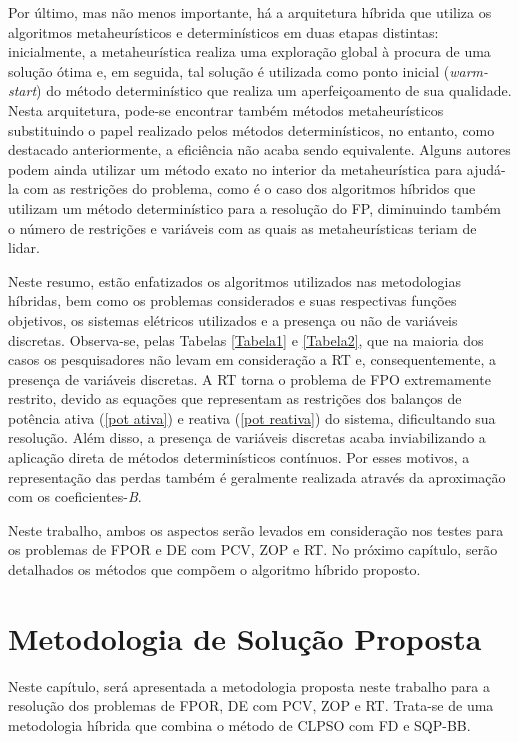 \documentclass[
	12pt,				%
	openany,			%
	twoside,			%
	a4paper,			%
	chapter=TITLE,		%
	section=Title,		%
	subsection=Title,	%
	subsubsection=Title,%
	english,			%
	french,				%
	spanish,			%
	brazil			%
	]{abntex2}
\begin{document}
\begin{ERRATA}
Por último, mas não menos importante, há a arquitetura híbrida que utiliza os algoritmos metaheurísticos e determinísticos em duas etapas distintas: inicialmente, a metaheurística realiza uma exploração global à procura de uma solução ótima e, em seguida, tal solução é utilizada como ponto inicial (\emph{warm-start}) do método determinístico que realiza um aperfeiçoamento de sua qualidade. Nesta arquitetura, pode-se encontrar também métodos metaheurísticos substituindo o papel realizado pelos métodos determinísticos, no entanto, como destacado anteriormente, a eficiência não acaba sendo equivalente. Alguns autores podem ainda utilizar um método exato no interior da metaheurística para ajudá-la com as restrições do problema, como é o caso dos algoritmos híbridos que utilizam um método determinístico para a resolução do FP, diminuindo também o número de restrições e variáveis com as quais as metaheurísticas teriam de lidar.


Neste resumo, estão enfatizados os algoritmos utilizados nas metodologias híbridas, bem como os problemas considerados e suas respectivas funções objetivos, os sistemas elétricos utilizados e a presença ou não de variáveis discretas. Observa-se, pelas Tabelas \ref{Tabela1} e \ref{Tabela2}, que na maioria dos casos os pesquisadores não levam em consideração a RT e, consequentemente, a presença de variáveis discretas. A RT torna o problema de FPO extremamente restrito, devido as equações que representam as restrições dos balanços de potência ativa (\ref{pot ativa}) e reativa (\ref{pot reativa}) do sistema, dificultando sua resolução. Além disso, a presença de variáveis discretas acaba inviabilizando a aplicação direta de métodos determinísticos contínuos.  Por esses motivos, a representação das perdas também é geralmente realizada através da aproximação com os coeficientes-\emph{B}. 

Neste trabalho, ambos os aspectos serão levados em consideração nos testes para os problemas de FPOR e DE com PCV, ZOP e RT. No próximo capítulo, serão detalhados os métodos que compõem o algoritmo híbrido proposto.


\chapter{Metodologia de Solução Proposta}

Neste capítulo, será apresentada a metodologia proposta neste trabalho para a
resolução dos problemas de FPOR, DE com PCV,  ZOP e RT. Trata-se de uma metodologia híbrida que combina o método de CLPSO com FD e SQP-BB.


\end{ERRATA}
\end{document}
